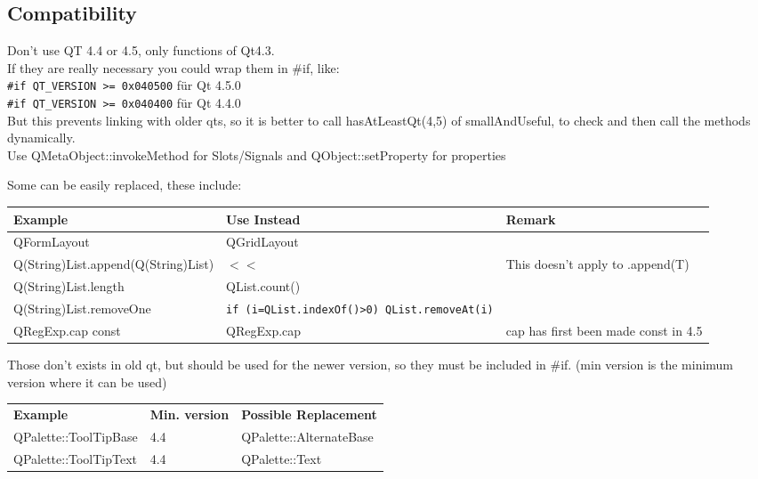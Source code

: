 \documentclass[10pt,a4paper,portrait]{article}
\begin{document}
\subsection {Compatibility}
Don't use QT 4.4 or 4.5, only functions of Qt4.3.\\
If they are really necessary you could wrap them in \#if, like: \\
\verb+#if QT_VERSION >= 0x040500+ für Qt 4.5.0\\
\verb+#if QT_VERSION >= 0x040400+ für Qt 4.4.0\\

But this prevents linking with older qts, so it is better  to call hasAtLeastQt(4,5) of smallAndUseful, to check and then call the methods dynamically.\\
Use QMetaObject::invokeMethod for Slots/Signals and QObject::setProperty for properties

Some can be easily replaced, these include:

\begin{center}
\begin{tabularx}{\textwidth}{lXX}
	\textbf{Example}                             & \textbf{Use Instead}                                       & \textbf{Remark}                               \\
\hline
	QFormLayout                         & QGridLayout                                       &  \\
	Q(String)List.append(Q(String)List) & $<<$                                              & This doesn't apply to .append(T)     \\
	Q(String)List.length                & QList.count()                                     &  \\
	Q(String)List.removeOne             & \verb+if (i=QList.indexOf()>0) QList.removeAt(i)+ &  \\
	QRegExp.cap const                   & QRegExp.cap                                       & cap has first been made const in 4.5 \\
\end{tabularx}
\end{center}

Those don't exists in old qt, but should be used for the newer version, so they must be included in \#if.
(min version is the minimum version where it can be used)

\begin{tabularx}{\textwidth}{lll}
\textbf{Example} & \textbf{Min. version} & \textbf{Possible Replacement}\\
QPalette::ToolTipBase & 4.4 & QPalette::AlternateBase\\
QPalette::ToolTipText & 4.4 & QPalette::Text
\end{tabularx}
\end{document}
